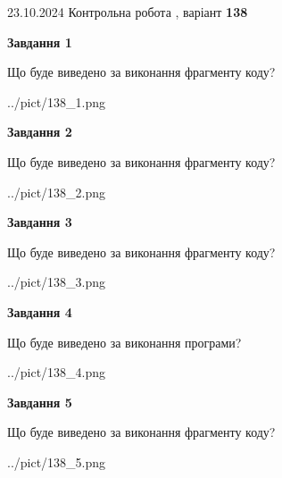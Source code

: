 \documentclass[12pt, ukrainian]{article}
\begin{document}
{\Large{23.10.2024 Контрольна робота , варіант  \No \textbf { 138 }\par}}
{
\begin {large}
{\begin {center}\textbf{Завдання 1}\end {center}}

Що буде виведено за виконання фрагменту коду?\par
\begin{center}
	{../pict/138_1.png}
\end{center}
\newpage

{\begin {center}\textbf{Завдання 2}\end {center}}

Що буде виведено за виконання фрагменту коду?\par
\begin{center}
	{../pict/138_2.png}
\end{center}
\newpage

{\begin {center}\textbf{Завдання 3}\end {center}}

Що буде виведено за виконання фрагменту коду?\par
\begin{center}
	{../pict/138_3.png}
\end{center}
\newpage

{\begin {center}\textbf{Завдання 4}\end {center}}

Що буде виведено за виконання програми?\par
\begin{center}
	{../pict/138_4.png}
\end{center}
\newpage

{\begin {center}\textbf{Завдання 5}\end {center}}

Що буде виведено за виконання фрагменту коду?\par
\begin{center}
	{../pict/138_5.png}
\end{center}
\newpage


\end{large}}
\end{document}
